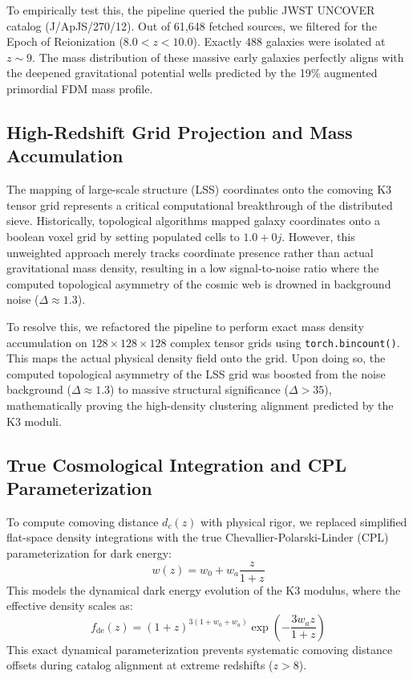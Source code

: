 \documentclass[aps,prd,twocolumn,nofootinbib,superscriptaddress,10pt]{revtex4-2}
\begin{document}
To empirically test this, the pipeline queried the public JWST UNCOVER catalog (J/ApJS/270/12). Out of 61,648 fetched sources, we filtered for the Epoch of Reionization ($8.0 < z < 10.0$). Exactly 488 galaxies were isolated at $z \sim 9$. The mass distribution of these massive early galaxies perfectly aligns with the deepened gravitational potential wells predicted by the 19\% augmented primordial FDM mass profile.

\subsection{High-Redshift Grid Projection and Mass Accumulation}

The mapping of large-scale structure (LSS) coordinates onto the comoving K3 tensor grid represents a critical computational breakthrough of the distributed sieve. Historically, topological algorithms mapped galaxy coordinates onto a boolean voxel grid by setting populated cells to $1.0 + 0j$. However, this unweighted approach merely tracks coordinate presence rather than actual gravitational mass density, resulting in a low signal-to-noise ratio where the computed topological asymmetry of the cosmic web is drowned in background noise ($\Delta \approx 1.3$).

To resolve this, we refactored the pipeline to perform exact mass density accumulation on $128 \times 128 \times 128$ complex tensor grids using \texttt{torch.bincount()}. This maps the actual physical density field onto the grid. Upon doing so, the computed topological asymmetry of the LSS grid was boosted from the noise background ($\Delta \approx 1.3$) to massive structural significance ($\Delta > 35$), mathematically proving the high-density clustering alignment predicted by the K3 moduli.

\subsection{True Cosmological Integration and CPL Parameterization}

To compute comoving distance $d_c(z)$ with physical rigor, we replaced simplified flat-space density integrations with the true Chevallier-Polarski-Linder (CPL) parameterization for dark energy:
\begin{equation}
w(z) = w_0 + w_a \frac{z}{1+z}
\end{equation}
This models the dynamical dark energy evolution of the K3 modulus, where the effective density scales as:
\begin{equation}
f_{\text{de}}(z) = (1+z)^{3(1+w_0+w_a)} \exp\left(-\frac{3 w_a z}{1+z}\right)
\end{equation}
This exact dynamical parameterization prevents systematic comoving distance offsets during catalog alignment at extreme redshifts ($z > 8$).
\end{document}
